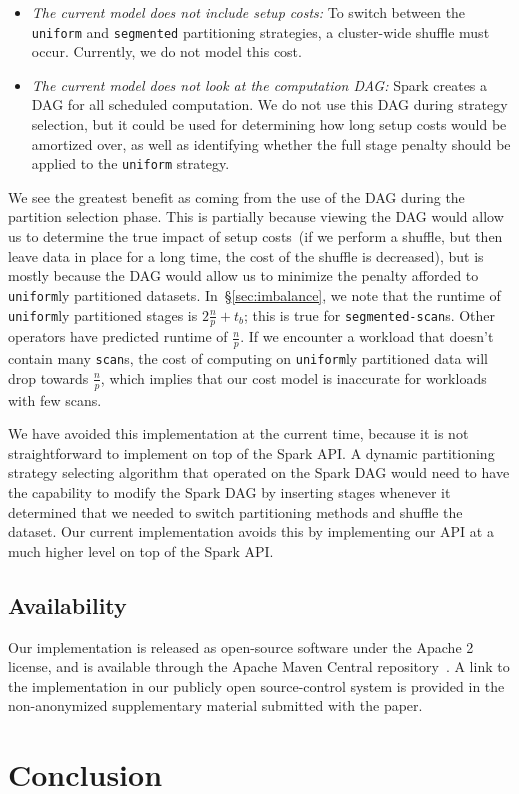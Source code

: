 \documentclass[preprint]{sigplanconf}
\theoremstyle{definition}
\begin{document}
\begin{itemize}
\item \emph{The current model does not include setup costs:} To switch between the \texttt{uniform} and
\texttt{segmented} partitioning strategies, a cluster-wide shuffle must occur. Currently, we do not model
this cost.
\item \emph{The current model does not look at the computation DAG:} Spark creates a DAG for all
scheduled computation. We do not use this DAG during strategy selection, but it could be used for
determining how long setup costs would be amortized over, as well as identifying whether the full
stage penalty should be applied to the \texttt{uniform} strategy.
\end{itemize}

We see the greatest benefit as coming from the use of the DAG during the partition selection phase.
This is partially because viewing the DAG would allow us to determine the true impact of setup costs~(if
we perform a shuffle, but then leave data in place for a long time, the cost of the shuffle is decreased),
but is mostly because the DAG would allow us to minimize the penalty afforded to \texttt{uniform}ly
partitioned datasets. In~\S\ref{sec:imbalance}, we note that the runtime of \texttt{uniform}ly partitioned
stages is $2\frac{n}{p} + t_b$; this is true for \texttt{segmented-scan}s. Other operators have predicted
runtime of $\frac{n}{p}$. If we encounter a workload that doesn't contain many \texttt{scan}s, the cost of
computing on \texttt{uniform}ly partitioned data will drop towards $\frac{n}{p}$, which implies that our
cost model is inaccurate for workloads with few scans.

We have avoided this implementation at the current time, because it is not straightforward to implement
on top of the Spark API. A dynamic partitioning strategy selecting algorithm that operated on the Spark
DAG would need to have the capability to modify the Spark DAG by inserting stages whenever it
determined that we needed to switch partitioning methods and shuffle the dataset. Our current
implementation avoids this by implementing our API at a much higher level on top of the Spark API.

\subsection{Availability}
\label{sec:availability}

Our implementation is released as open-source software under the Apache 2 license, and is available
through the Apache Maven Central repository~\cite{maven}. A link to the implementation in our
publicly open source-control system is provided in the non-anonymized supplementary material
submitted with the paper.

\section{Conclusion}
\label{sec:conclusion}




\end{document}
